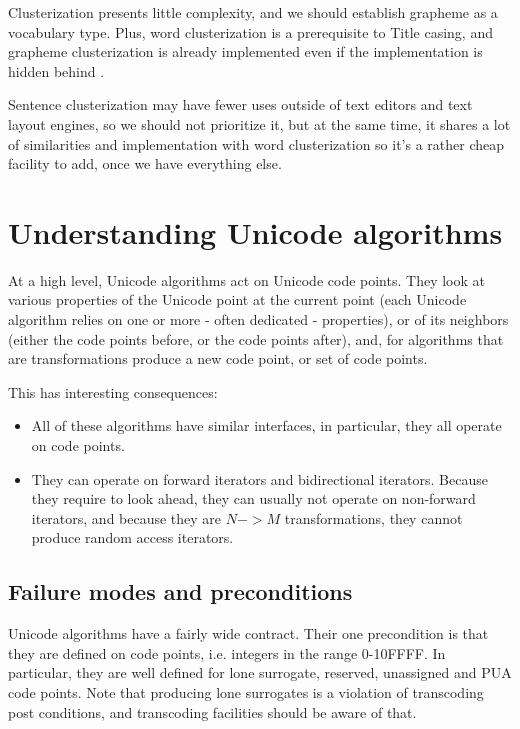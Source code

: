 \documentclass{wg21}
\begin{document}
Clusterization presents little complexity, and we should establish grapheme as a vocabulary type. Plus, word clusterization is a prerequisite to Title casing, and grapheme clusterization is already implemented even if the implementation is hidden behind .

Sentence clusterization may have fewer uses outside of text editors and text layout engines, so we should not prioritize it, but at the same time, it shares a lot of similarities and implementation with word clusterization so it's a rather cheap facility to add, once we have everything else.

\section{Understanding Unicode algorithms}

At a high level, Unicode algorithms act on Unicode code points.
They look at various properties of the Unicode point at the current point (each Unicode algorithm relies on one or more - often dedicated - properties), or of its neighbors (either the code points before, or the code points after), and, for algorithms that are transformations produce a new code point, or set of code points.

This has interesting consequences:
\begin{itemize}
\item All of these algorithms have similar interfaces, in particular, they all operate on code points.
\item They can operate on forward iterators and bidirectional iterators. Because they require to look ahead, they can usually not operate on non-forward iterators, and because they are $N->M$ transformations, they cannot produce random access iterators.
\end{itemize}

\subsection{Failure modes and preconditions}

Unicode algorithms have a fairly wide contract.
Their one precondition is that they are defined on code points, i.e. integers in the range 0-10FFFF.
In particular, they are well defined for lone surrogate, reserved, unassigned and PUA code points.
Note that producing lone surrogates is a violation of transcoding post conditions, and transcoding facilities should be aware of that.
\end{document}
